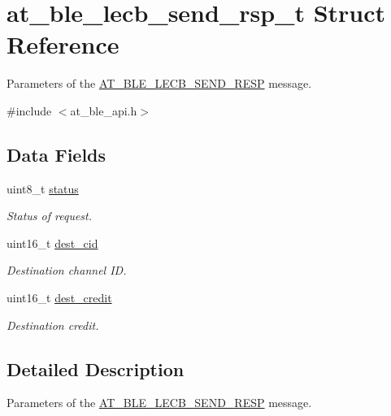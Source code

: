 \hypertarget{structat__ble__lecb__send__rsp__t}{}\section{at\+\_\+ble\+\_\+lecb\+\_\+send\+\_\+rsp\+\_\+t Struct Reference}
\label{structat__ble__lecb__send__rsp__t}


Parameters of the \mbox{\hyperlink{at__ble__api_8h_a3324640b95f33169515f89738ed5baeba441882d6e928be9bcca0c21df3f61db7}{A\+T\+\_\+\+B\+L\+E\+\_\+\+L\+E\+C\+B\+\_\+\+S\+E\+N\+D\+\_\+\+R\+E\+SP}} message.  




{\ttfamily \#include $<$at\+\_\+ble\+\_\+api.\+h$>$}

\subsection*{Data Fields}
\begin{DoxyCompactItemize}
\item 
uint8\+\_\+t \mbox{\hyperlink{structat__ble__lecb__send__rsp__t_ade818037fd6c985038ff29656089758d}{status}}
\begin{DoxyCompactList}\small\item\em Status of request. \end{DoxyCompactList}\item 
uint16\+\_\+t \mbox{\hyperlink{structat__ble__lecb__send__rsp__t_a37d822ac0a55245d703099a527d6bd3a}{dest\+\_\+cid}}
\begin{DoxyCompactList}\small\item\em Destination channel ID. \end{DoxyCompactList}\item 
uint16\+\_\+t \mbox{\hyperlink{structat__ble__lecb__send__rsp__t_ac885778ddeb570d83c60b0d142d9de73}{dest\+\_\+credit}}
\begin{DoxyCompactList}\small\item\em Destination credit. \end{DoxyCompactList}\end{DoxyCompactItemize}


\subsection{Detailed Description}
Parameters of the \mbox{\hyperlink{at__ble__api_8h_a3324640b95f33169515f89738ed5baeba441882d6e928be9bcca0c21df3f61db7}{A\+T\+\_\+\+B\+L\+E\+\_\+\+L\+E\+C\+B\+\_\+\+S\+E\+N\+D\+\_\+\+R\+E\+SP}} message. 

